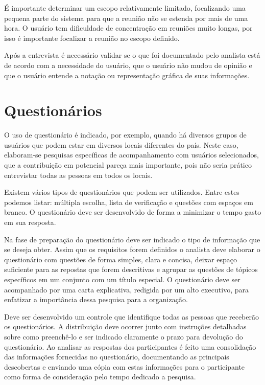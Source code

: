 \documentclass[12pt]{article}
\begin{document}
É importante determinar um escopo relativamente limitado, focalizando uma pequena parte do sistema para que a reunião não se estenda por mais de uma hora. O usuário tem dificuldade de concentração em reuniões muito longas, por isso é importante focalizar a reunião no escopo definido.

Após a entrevista é necessário validar se o que foi documentado pelo analista está de acordo com a necessidade do usuário, que o usuário não mudou de opinião e que o usuário entende a notação ou representação gráfica de suas informações.

\section{Questionários}

O uso de questionário é indicado, por exemplo, quando há diversos grupos de usuários que podem estar em diversos locais diferentes do país. Neste caso, elaboram-se pesquisas específicas de acompanhamento com usuários selecionados, que a contribuição em potencial pareça mais importante, pois não seria prático entrevistar todas as pessoas em todos os locais.

Existem vários tipos de questionários que podem ser utilizados. Entre estes podemos listar: múltipla escolha, lista de verificação e questões com espaços em branco. O questionário deve ser desenvolvido de forma a minimizar o tempo gasto em sua resposta.

Na fase de preparação do questionário deve ser indicado o tipo de informação que se deseja obter. Assim que os requisitos forem definidos o analista deve elaborar o questionário com questões de forma simples, clara e concisa, deixar espaço suficiente para as repostas que forem descritivas e agrupar as questões de tópicos específicos em um conjunto com um título especial. O questionário deve ser acompanhado por uma carta explicativa, redigida por um alto executivo, para enfatizar a importância dessa pesquisa para a organização.

Deve ser desenvolvido um controle que identifique todas as pessoas que receberão os questionários. A distribuição deve ocorrer junto com instruções detalhadas sobre como preenchê-lo e ser indicado claramente o prazo para devolução do questionário. Ao analisar as respostas dos participantes é feito uma consolidação das informações fornecidas no questionário, documentando as principais descobertas e enviando uma cópia com estas informações para o participante como forma de consideração pelo tempo dedicado a pesquisa.
\end{document}
